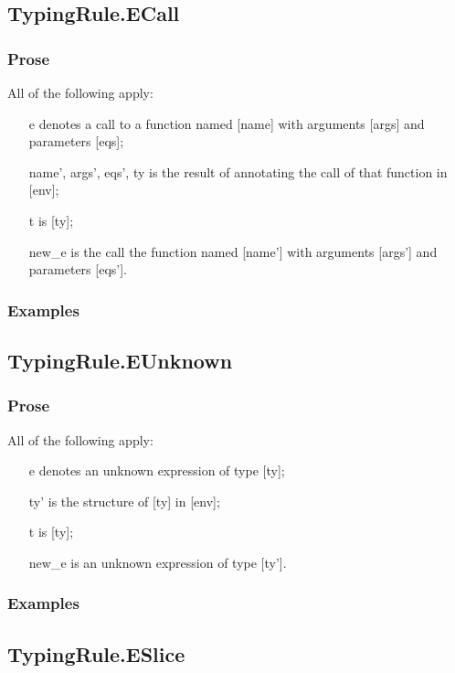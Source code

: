 \documentclass{book}
\begin{document}
\subsection{TypingRule.ECall}

  \subsubsection{Prose}
  All of the following apply:
  \begin{itemize}
  \item  [e] denotes a call to a function named [name] with arguments [args] and
    parameters [eqs];
  \item  [name', args', eqs', ty] is the result of annotating the call of
    that function in [env];
  \item  [t] is [ty];
  \item  [new\_e] is the call the function named [name'] with arguments [args']
    and parameters [eqs'].
  \end{itemize}

  \subsubsection{Examples}

\subsection{TypingRule.EUnknown}

  \subsubsection{Prose}
  All of the following apply:
  \begin{itemize}
  \item  [e] denotes an unknown expression of type [ty];
  \item  [ty'] is the structure of [ty] in [env];
  \item  [t] is [ty];
  \item  [new\_e] is an unknown expression of type [ty'].
  \end{itemize}

  \subsubsection{Examples}

\subsection{TypingRule.ESlice}
\end{document}
